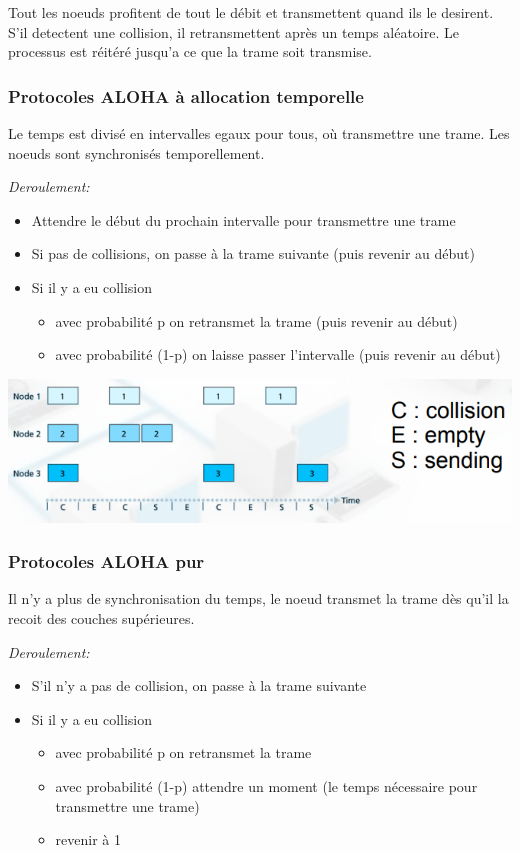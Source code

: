 \documentclass[a4paper, 12pt, french]{article}
\begin{document}
	Tout les noeuds profitent de tout le débit et transmettent quand ils le desirent. S'il detectent une collision, il retransmettent après un temps aléatoire. Le processus est réitéré jusqu'a ce que la trame soit transmise.

	\subsubsection{Protocoles ALOHA à allocation temporelle}

	Le temps est divisé en intervalles egaux pour tous, où transmettre une trame. Les noeuds sont synchronisés temporellement.

	\emph{Deroulement:}
	\begin{itemize}
		\item Attendre le début du prochain intervalle pour transmettre une trame
		\item Si pas de collisions, on passe à la trame suivante (puis revenir au début)
		\item Si il y a eu collision
		\begin{itemize}
			\item avec probabilité p on retransmet la trame (puis revenir au début)
			\item avec probabilité (1-p) on laisse passer l'intervalle (puis revenir au début)
		\end{itemize}
	\end{itemize}

	\includegraphics[width=13.8cm]{reseau_aloha}

	\subsubsection{Protocoles ALOHA pur}

	Il n'y a plus de synchronisation du temps, le noeud transmet la trame dès qu'il la recoit des couches supérieures.

	\emph{Deroulement:}
	\begin{itemize}
		\item S'il n'y a pas de collision, on passe à la trame suivante
		\item Si il y a eu collision
		\begin{itemize}
			\item avec probabilité p on retransmet la trame
			\item avec probabilité (1-p) attendre un moment (le temps nécessaire pour transmettre une trame)
			\item revenir à 1
		\end{itemize}
	\end{itemize}
\end{document}
